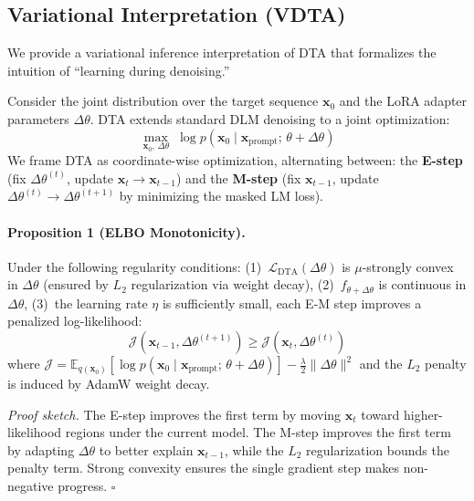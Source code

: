 \documentclass{article}
\begin{document}
\subsection{Variational Interpretation (VDTA)}
\label{sec:vdta}

We provide a variational inference interpretation of DTA that formalizes the intuition of ``learning during denoising.''

Consider the joint distribution over the target sequence $\mathbf{x}_0$ and the LoRA adapter parameters $\Delta\theta$. DTA extends standard DLM denoising to a joint optimization:
\begin{equation}
\max_{\mathbf{x}_0,\, \Delta\theta}\; \log p(\mathbf{x}_0 \mid \mathbf{x}_{\text{prompt}};\, \theta + \Delta\theta)
\end{equation}
We frame DTA as coordinate-wise optimization, alternating between:
the \textbf{E-step} (fix $\Delta\theta^{(t)}$, update $\mathbf{x}_t \to \mathbf{x}_{t-1}$) and
the \textbf{M-step} (fix $\mathbf{x}_{t-1}$, update $\Delta\theta^{(t)} \to \Delta\theta^{(t+1)}$ by minimizing the masked LM loss).

\paragraph{Proposition 1 (ELBO Monotonicity).}
Under the following regularity conditions:
(1)~$\mathcal{L}_{\text{DTA}}(\Delta\theta)$ is $\mu$-strongly convex in $\Delta\theta$ (ensured by $L_2$ regularization via weight decay),
(2)~$f_{\theta + \Delta\theta}$ is continuous in $\Delta\theta$,
(3)~the learning rate $\eta$ is sufficiently small,
each E-M step improves a penalized log-likelihood:
\begin{equation}
\mathcal{J}(\mathbf{x}_{t-1}, \Delta\theta^{(t+1)}) \geq \mathcal{J}(\mathbf{x}_t, \Delta\theta^{(t)})
\end{equation}
where
$\mathcal{J} = \mathbb{E}_{q(\mathbf{x}_0)}\!\left[\log p(\mathbf{x}_0 \mid \mathbf{x}_{\text{prompt}};\, \theta + \Delta\theta)\right] - \frac{\lambda}{2}\|\Delta\theta\|^2$
and the $L_2$ penalty is induced by AdamW weight decay.

\emph{Proof sketch.} The E-step improves the first term by moving $\mathbf{x}_t$ toward higher-likelihood regions under the current model. The M-step improves the first term by adapting $\Delta\theta$ to better explain $\mathbf{x}_{t-1}$, while the $L_2$ regularization bounds the penalty term. Strong convexity ensures the single gradient step makes non-negative progress. $\square$
\end{document}
